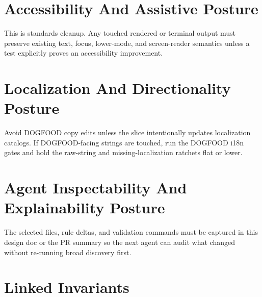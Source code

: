 \section{Accessibility And Assistive Posture}\label{record-232-accessibility-and-assistive-posture}

This is standards cleanup. Any touched rendered or terminal output must preserve existing text, focus, lower-mode, and screen-reader semantics unless a test explicitly proves an accessibility improvement.

\section{Localization And Directionality Posture}\label{record-232-localization-and-directionality-posture}

Avoid DOGFOOD copy edits unless the slice intentionally updates localization catalogs. If DOGFOOD-facing strings are touched, run the DOGFOOD i18n gates and hold the raw-string and missing-localization ratchets flat or lower.

\section{Agent Inspectability And Explainability Posture}\label{record-232-agent-inspectability-and-explainability-posture}

The selected files, rule deltas, and validation commands must be captured in this design doc or the PR summary so the next agent can audit what changed without re-running broad discovery first.

\section{Linked Invariants}\label{record-232-linked-invariants}

